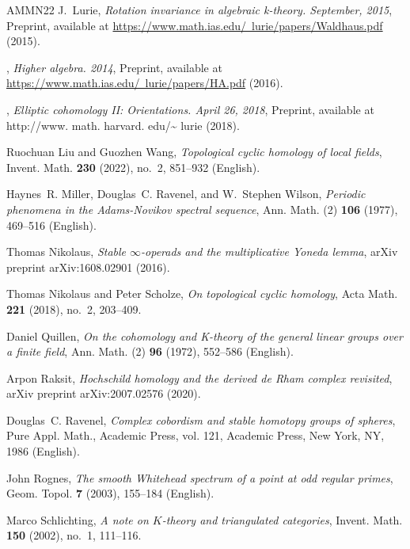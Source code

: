 \documentclass[english,10pt]{amsart}
\theoremstyle{definition}
\numberwithin{equation}{section}
\begin{document}
{\begin{thebibliography}{AMMN22}
J.~Lurie, \emph{Rotation invariance in algebraic k-theory. {S}eptember, 2015}, Preprint, available at \href{https://www.math.ias.edu/~lurie/papers/Waldhaus.pdf}{https://www.math.ias.edu/~lurie/papers/Waldhaus.pdf} (2015).

\bysame, \emph{Higher algebra. 2014}, Preprint, available at \href{https://www.math.ias.edu/~lurie/papers/HA.pdf}{https://www.math.ias.edu/~lurie/papers/HA.pdf} (2016).

\bysame, \emph{Elliptic cohomology {II}: Orientations. {A}pril 26, 2018}, Preprint, available at http://www. math. harvard. edu/\~{} lurie (2018).

Ruochuan Liu and Guozhen Wang, \emph{Topological cyclic homology of local fields}, Invent. Math. \textbf{230} (2022), no.~2, 851--932 (English).

Haynes~R. Miller, Douglas~C. Ravenel, and W.~Stephen Wilson, \emph{Periodic phenomena in the {Adams}-{Novikov} spectral sequence}, Ann. Math. (2) \textbf{106} (1977), 469--516 (English).

Thomas Nikolaus, \emph{Stable $\infty $-operads and the multiplicative {Y}oneda lemma}, arXiv preprint arXiv:1608.02901 (2016).

Thomas Nikolaus and Peter Scholze, \emph{On topological cyclic homology}, Acta Math. \textbf{221} (2018), no.~2, 203--409. 

Daniel Quillen, \emph{On the cohomology and {K}-theory of the general linear groups over a finite field}, Ann. Math. (2) \textbf{96} (1972), 552--586 (English).

Arpon Raksit, \emph{Hochschild homology and the derived de {R}ham complex revisited}, arXiv preprint arXiv:2007.02576 (2020).

Douglas~C. Ravenel, \emph{Complex cobordism and stable homotopy groups of spheres}, Pure Appl. Math., Academic Press, vol. 121, Academic Press, New York, NY, 1986 (English).

John Rognes, \emph{The smooth {Whitehead} spectrum of a point at odd regular primes}, Geom. Topol. \textbf{7} (2003), 155--184 (English).

Marco Schlichting, \emph{A note on {$K$}-theory and triangulated categories}, Invent. Math. \textbf{150} (2002), no.~1, 111--116. 


\end{thebibliography}}
\end{document}

